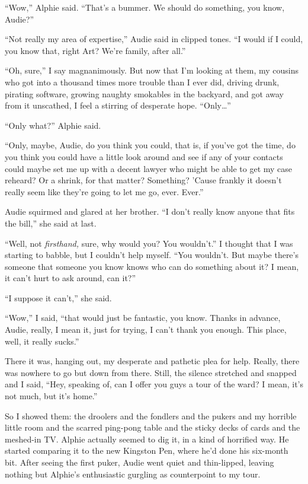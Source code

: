 “Wow,” Alphie said. “That’s a bummer. We should do something, you
know, Audie?”

“Not really my area of expertise,” Audie said in clipped tones. “I
would if I could, you know that, right Art? We’re family, after
all.”

“Oh, sure,” I say magnanimously. But now that I’m looking at them,
my cousins who got into a thousand times more trouble than I ever
did, driving drunk, pirating software, growing naughty smokables in
the backyard, and got away from it unscathed, I feel a stirring of
desperate hope. “Only\ldots{}”

“Only what?” Alphie said.

“Only, maybe, Audie, do you think you could, that is, if you’ve got
the time, do you think you could have a little look around and see
if any of your contacts could maybe set me up with a decent lawyer
who might be able to get my case reheard? Or a shrink, for that
matter? Something? ’Cause frankly it doesn’t really seem like
they’re going to let me go, ever. Ever.”

Audie squirmed and glared at her brother. “I don’t really know
anyone that fits the bill,” she said at last.

“Well, not \emph{firsthand,} sure, why would you? You wouldn’t.” I
thought that I was starting to babble, but I couldn’t help myself.
“You wouldn’t. But maybe there’s someone that someone you know
knows who can do something about it? I mean, it can’t hurt to ask
around, can it?”

“I suppose it can’t,” she said.

“Wow,” I said, “that would just be fantastic, you know. Thanks in
advance, Audie, really, I mean it, just for trying, I can’t thank
you enough. This place, well, it really sucks.”

There it was, hanging out, my desperate and pathetic plea for help.
Really, there was nowhere to go but down from there. Still, the
silence stretched and snapped and I said, “Hey, speaking of, can I
offer you guys a tour of the ward? I mean, it’s not much, but it’s
home.”

So I showed them: the droolers and the fondlers and the pukers and
my horrible little room and the scarred ping-pong table and the
sticky decks of cards and the meshed-in TV. Alphie actually seemed
to dig it, in a kind of horrified way. He started comparing it to
the new Kingston Pen, where he’d done his six-month bit. After
seeing the first puker, Audie went quiet and thin-lipped, leaving
nothing but Alphie’s enthusiastic gurgling as counterpoint to my
tour.

